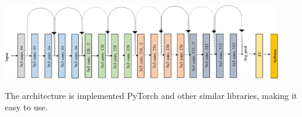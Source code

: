 \begin{center}
    \includegraphics[width=0.9\textwidth]{images/ResNet-18-architecture.png}
    \label{fig:resnet-18-architecture}
\end{center}


The architecture is implemented PyTorch\cite{PyTorch} and other similar libraries, making it easy to use.
